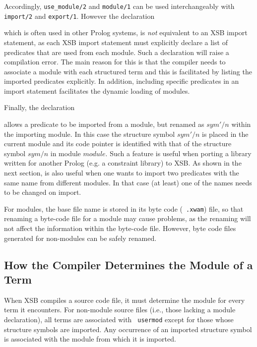 
\noindent
Accordingly, {\tt use\_module/2} and {\tt module/1} can be used
interchangeably with {\tt import/2} and {\tt export/1}.  However the
declaration


\noindent
which is often used in other Prolog systems, is {\em not} equivalent
to an XSB import statement, as each XSB import statement must
explicitly declare a list of predicates that are used from each
module.  Such a declaration will raise a compilation error. The main
reason for this is that the compiler needs to associate a module with
each structured term and this is facilitated by listing the imported
predicates explicitly.  In addition, including specific predicates in
an import statement facilitates the dynamic loading of modules.

Finally, the declaration 


\noindent
allows a predicate to be imported from a module, but renamed as
$sym'/n$ within the importing module.  In this case the structure
symbol $sym'/n$ is placed in the current module and its code pointer
is identified with that of the structure symbol $sym/n$ in module
$module$.  Such a feature is useful when porting a library written for
another Prolog (e.g. a constraint library) to XSB.  As shown in the
next section, is also useful when one wants to import two predicates
with the same name from different modules.  In that case (at least)
one of the names needs to be changed on import.

For modules, the base file name is stored in its byte code ({\tt
  .xwam}) file, so that renaming a byte-code file for a module may cause
problems, as the renaming will not affect the information within the
byte-code file.  However, byte code files generated for non-modules
can be safely renamed.

\subsection{How the Compiler Determines the Module of a Term}

When XSB compiles a source code file, it must determine the module for
every term it encounters.  For non-module source files (i.e., those
lacking a module declaration), all terms are associated with {\tt
  usermod} except for those whose structure symbols are imported.  Any
occurrence of an imported structure symbol is associated with the
module from which it is imported.


